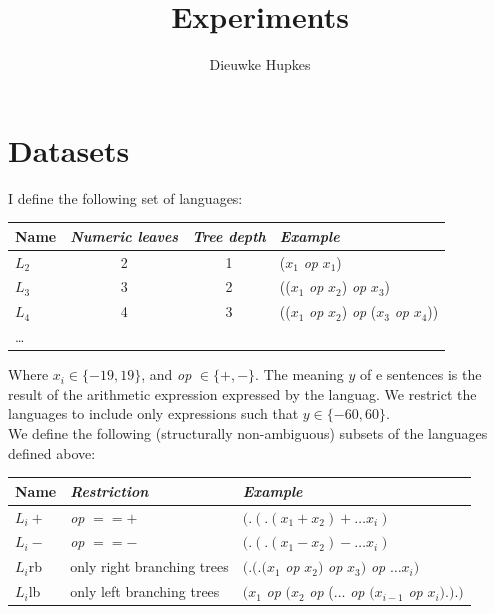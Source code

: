 \documentclass{article}
\author{Dieuwke Hupkes}
\title{Experiments}
\date{}
\begin{document}
\maketitle


\section{Datasets}

I define the following set of languages:

\begin{table}[!ht]
\begin{tabular}{lccl}
    \textbf{Name} & \textit{Numeric leaves} & \textit{Tree depth} & \textit{Example}\\
    \hline
    $L_2$ & 2 & 1 & ($x_1$ \textit{op} $x_1$)\\
    $L_3$ & 3 & 2 & (($x_1$ \textit{op} $x_2$) \textit{op} $x_3$)\\
    $L_4$ & 4 & 3 & (($x_1$ \textit{op} $x_2$) \textit{op} ($x_3$ \textit{op} $x_4$))\\
    \dots& & &\\
\end{tabular}
\end{table}

\noindent Where $x_i\in\{-19,19\}$, and \textit{op} $\in\{+,-\}$. The meaning $y$ of e sentences is the result of the arithmetic expression expressed by the languag. We restrict the languages to include only expressions such that $y\in\{-60,60\}$.\\

\noindent We define the following (structurally non-ambiguous) subsets of the languages defined above:

\begin{table}[ht!]
\begin{tabular}{lll}
    \textbf{Name} & \textit{Restriction} & \textit{Example} \\
    \hline
    $L_i+$ & \textit{op} $==+$ & $(.(.(x_1 + x_2) + \dots x_i)$ \\
    $L_i-$ & \textit{op} $==-$ & $(.(.(x_1 - x_2) - \dots x_i)$ \\
    $L_i$rb & only right branching trees & $(.(.(x_1$ \textit{op} $x_2)$ \textit{op} $x_3)$ \textit{op} $\ldots x_i)$ \\
    $L_i$lb & only left branching trees & $(x_1$ \textit{op} $(x_2$ \textit{op} ($\ldots$ \textit{op} $(x_{i-1}$ \textit{op} $x_i).).)$ \\
\end{tabular}
\end{table}
\end{document}
